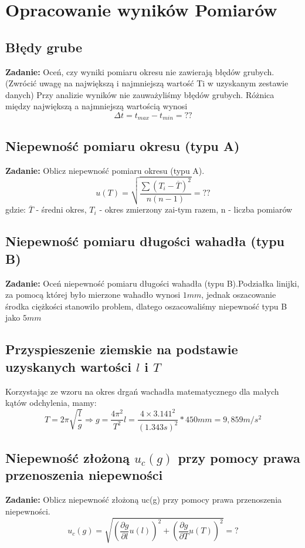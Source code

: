 \documentclass[18pt, twoside]{article}
\begin{document}
 
 
 
\section{Opracowanie wyników Pomiarów}
\subsection{Błędy grube}
\textbf{Zadanie:} Oceń, czy wyniki pomiaru okresu nie zawierają błędów grubych. (Zwrócić uwagę na największą 
 i najmniejszą wartość Ti w uzyskanym zestawie danych)\newline
Przy analizie wyników nie zauważyliśmy błędów grubych. Różnica między największą a najmniejszą wartością wynosi \[\Delta t = t_{max} - t_{min} = ?? \]
\subsection{Niepewność pomiaru okresu (typu A)}
\textbf{Zadanie:} Oblicz niepewność pomiaru okresu (typu A). \newline
\[u(T) =\sqrt{\frac{\sum{(T_i - \overline T)^2}}{n(n-1)}} = ??\] gdzie:  \(\overline T\) - średni okres, \(T_i\) - okres zmierzony zai-tym razem, n - liczba pomiarów
 \subsection{Niepewność pomiaru długości wahadła (typu B)}
\textbf{Zadanie:} Oceń niepewność pomiaru długości wahadła (typu B).\newline Podziałka linijki, za pomocą której było mierzone wahadło wynosi \(1mm\), jednak oszacowanie środka ciężkości stanowiło problem, dlatego oszacowaliśmy niepewność typu B jako \(5mm\)
 \subsection{Przyspieszenie ziemskie  na podstawie uzyskanych wartości \(l\) i \(T\)}
Korzystając ze wzoru na okres drgań wachadła matematycznego dla małych kątów odchylenia, mamy: \[T = 2\pi \sqrt{\frac{l}{g}} \Rightarrow g = \frac{4\pi^2}{T^2}l = \frac{4 \times 3.141^2}{(1.343s)^2} * 450mm = 9,859 m/s^2\]
 \subsection{Niepewność złożoną \(u_c(g)\) przy pomocy prawa przenoszenia niepewności}
\textbf{Zadanie:} Oblicz niepewność złożoną uc(g) przy pomocy prawa przenoszenia niepewności. \newline
\[u_c(g) = \sqrt{(\frac{\partial g}{\partial l} u(l))^2 + (\frac{\partial g}{\partial T} u(T))^2} = ?\]
\end{document}
